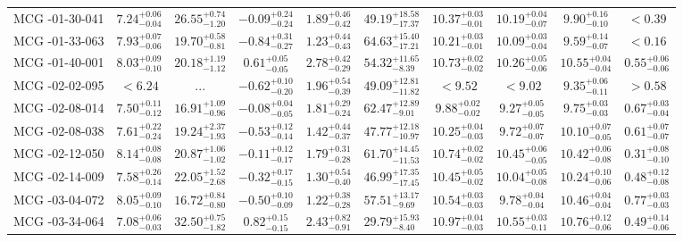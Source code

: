 \documentclass[onecolumn]{mn2e}
\begin{document}
\begin{landscape}
{\begin{center}
\begin{longtable}{lccccccccc}
MCG -01-30-041 & $7.24_{-0.04}^{+0.06}$ & $26.55_{-1.20}^{+0.74}$ & $-0.09_{-0.24}^{+0.24}$ & $1.89_{-0.42}^{+0.46}$ &$49.19_{-17.37}^{+18.58}$ & $10.37_{-0.01}^{+0.03}$ & $10.19_{-0.07}^{+0.04}$ & $9.90_{-0.10}^{+0.16}$ & $<0.39$ \\
MCG -01-33-063 & $7.93_{-0.06}^{+0.07}$ & $19.70_{-0.81}^{+0.58}$ & $-0.84_{-0.27}^{+0.31}$ & $1.23_{-0.43}^{+0.44}$ &$64.63_{-17.21}^{+15.40}$ & $10.21_{-0.01}^{+0.03}$ & $10.09_{-0.04}^{+0.03}$ & $9.59_{-0.07}^{+0.14}$ & $<0.16$ \\
MCG -01-40-001 & $8.03_{-0.10}^{+0.09}$ & $20.18_{-1.12}^{+1.19}$ & $0.61_{-0.05}^{+0.05}$ & $2.78_{-0.29}^{+0.42}$ &$54.32_{-8.39}^{+11.65}$ & $10.73_{-0.02}^{+0.02}$ & $10.26_{-0.06}^{+0.05}$ & $10.55_{-0.04}^{+0.04}$ & $0.55_{-0.06}^{+0.06}$ \\
MCG -02-02-095 & $<6.24$ & ... & $-0.62_{-0.20}^{+0.10}$ & $1.96_{-0.39}^{+0.54}$ &$49.09_{-11.82}^{+12.81}$ & $<9.52$ & $<9.02$ & $9.35_{-0.11}^{+0.06}$ & $>0.58$ \\
MCG -02-08-014 & $7.50_{-0.12}^{+0.11}$ & $16.91_{-0.96}^{+1.09}$ & $-0.08_{-0.05}^{+0.04}$ & $1.81_{-0.24}^{+0.29}$ &$62.47_{-9.01}^{+12.89}$ & $9.88_{-0.02}^{+0.02}$ & $9.27_{-0.05}^{+0.05}$ & $9.75_{-0.03}^{+0.03}$ & $0.67_{-0.04}^{+0.03}$ \\
MCG -02-08-038 & $7.61_{-0.24}^{+0.22}$ & $19.24_{-1.93}^{+2.37}$ & $-0.53_{-0.14}^{+0.12}$ & $1.42_{-0.37}^{+0.44}$ &$47.77_{-10.97}^{+12.18}$ & $10.25_{-0.03}^{+0.04}$ & $9.72_{-0.07}^{+0.07}$ & $10.10_{-0.05}^{+0.07}$ & $0.61_{-0.07}^{+0.07}$ \\
MCG -02-12-050 & $8.14_{-0.08}^{+0.08}$ & $20.87_{-1.02}^{+1.06}$ & $-0.11_{-0.17}^{+0.12}$ & $1.79_{-0.28}^{+0.31}$ &$61.70_{-11.53}^{+14.45}$ & $10.74_{-0.02}^{+0.02}$ & $10.45_{-0.05}^{+0.06}$ & $10.42_{-0.08}^{+0.06}$ & $0.31_{-0.10}^{+0.08}$ \\
MCG -02-14-009 & $7.58_{-0.14}^{+0.26}$ & $22.05_{-2.68}^{+1.52}$ & $-0.32_{-0.15}^{+0.17}$ & $1.30_{-0.40}^{+0.54}$ &$46.99_{-17.45}^{+17.35}$ & $10.45_{-0.02}^{+0.05}$ & $10.04_{-0.08}^{+0.05}$ & $10.24_{-0.06}^{+0.10}$ & $0.48_{-0.08}^{+0.12}$ \\
MCG -03-04-072 & $8.05_{-0.10}^{+0.09}$ & $16.72_{-0.80}^{+0.84}$ & $-0.50_{-0.09}^{+0.10}$ & $1.22_{-0.28}^{+0.38}$ &$57.51_{-9.69}^{+13.17}$ & $10.54_{-0.03}^{+0.03}$ & $9.78_{-0.04}^{+0.04}$ & $10.46_{-0.04}^{+0.04}$ & $0.77_{-0.03}^{+0.03}$ \\
MCG -03-34-064 & $7.08_{-0.03}^{+0.06}$ & $32.50_{-1.82}^{+0.75}$ & $0.82_{-0.15}^{+0.15}$ & $2.43_{-0.91}^{+0.82}$ &$29.79_{-8.40}^{+15.93}$ & $10.97_{-0.03}^{+0.04}$ & $10.55_{-0.11}^{+0.03}$ & $10.76_{-0.06}^{+0.12}$ & $0.49_{-0.06}^{+0.14}$ \\

\end{longtable}
\end{center}}
\end{landscape}
\end{document}
